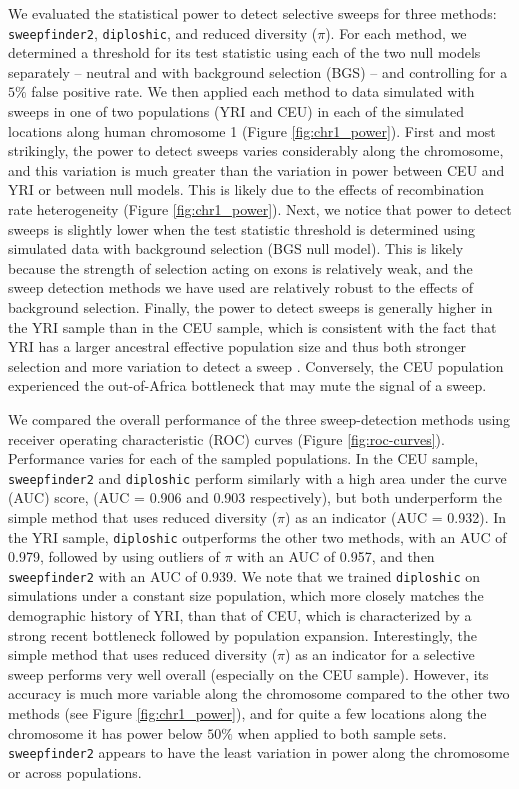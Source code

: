 \documentclass[hidelinks]{article}
\newcommand{\sweepfinder}{\texttt{sweepfinder2}\xspace}
\newcommand{\diploshic}{\texttt{diploshic}\xspace}
\begin{document}
    We evaluated the statistical power to detect selective sweeps for three methods:
    \sweepfinder \citep{degiorgio2016sweepfinder2},
    \diploshic \citep{kern2018diplos},
    and reduced diversity ($\pi$).
    For each method, we determined a threshold for its test statistic
    using each of the two null models separately -- neutral and with background selection (BGS)
    -- and controlling for a $5\%$ false positive rate.
    We then applied each method to data simulated with sweeps in one of two populations (YRI and CEU)
    in each of the simulated locations along human chromosome 1 (Figure \ref{fig:chr1_power}).
    First and most strikingly, the power to detect sweeps varies considerably along the chromosome,
    and this variation is much greater than the variation in power between CEU and YRI or between
    null models. This is likely due to the effects of recombination rate heterogeneity (Figure \ref{fig:chr1_power}).
    Next, we notice that power to detect sweeps is slightly lower when the test statistic threshold
    is determined using simulated data with background selection (BGS null model).
    This is likely because the strength of selection acting on exons is relatively weak, and the
    sweep detection methods we have used are relatively robust to the effects of background selection.
    Finally, the power to detect sweeps is generally higher in the YRI sample
    than in the CEU sample, which is consistent with the fact that YRI has a larger ancestral effective population size and
    thus both stronger selection and more variation to detect a sweep \citep[e.g.,][]{simonsen1995properties}.
    Conversely, the CEU population experienced the out-of-Africa bottleneck that may mute the signal of a sweep.

    We compared the overall performance of the three sweep-detection methods using
    receiver operating characteristic (ROC) curves (Figure \ref{fig:roc-curves}).
    Performance varies for each of the sampled populations.
    In the CEU sample, \sweepfinder and \diploshic perform similarly with a high area under the curve (AUC) score,
    (AUC = 0.906 and 0.903 respectively), but both underperform the simple method
    that uses reduced diversity ($\pi$) as an indicator (AUC = 0.932).
    In the YRI sample, \diploshic outperforms the other two methods,
    with an AUC of 0.979, followed by using outliers of $\pi$ with an AUC of 0.957,
    and then \sweepfinder with an AUC of 0.939.
    We note that we trained \diploshic on simulations under a constant size population,
    which more closely matches the demographic history of YRI, than that of CEU, which
    is characterized by a strong recent bottleneck followed by population expansion.
    Interestingly, the simple method that uses reduced diversity ($\pi$) as an indicator
    for a selective sweep performs very well overall (especially on the CEU sample).
    However, its accuracy is much more variable along the chromosome compared to the other two methods (see Figure \ref{fig:chr1_power}),
    and for quite a few locations along the chromosome it has power below $50\%$
    when applied to both sample sets.
    \sweepfinder appears to have the least variation in power along the chromosome or across populations.
\end{document}
